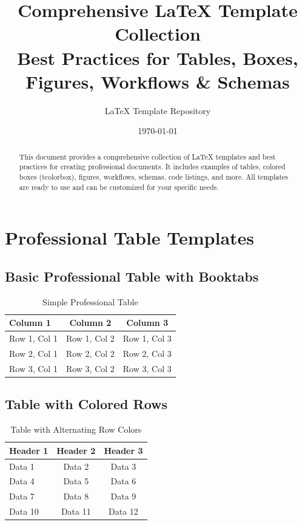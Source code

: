 \documentclass[a4paper,12pt]{article}
\title{\textbf{Comprehensive LaTeX Template Collection}\\
\large Best Practices for Tables, Boxes, Figures, Workflows \& Schemas}
\author{LaTeX Template Repository}
\date{\today}
\begin{document}
\maketitle

\begin{abstract}
This document provides a comprehensive collection of LaTeX templates and best 
practices for creating professional documents. It includes examples of tables, 
colored boxes (tcolorbox), figures, workflows, schemas, code listings, and more.
All templates are ready to use and can be customized for your specific needs.
\end{abstract}

\tableofcontents
\newpage

\section{Professional Table Templates}

\subsection{Basic Professional Table with Booktabs}
\begin{table}[H]
\centering
\caption{Simple Professional Table}
\label{tab:simple}
\begin{tabular}{lcc}
\toprule
\textbf{Column 1} & \textbf{Column 2} & \textbf{Column 3} \\
\midrule
Row 1, Col 1 & Row 1, Col 2 & Row 1, Col 3 \\
Row 2, Col 1 & Row 2, Col 2 & Row 2, Col 3 \\
Row 3, Col 1 & Row 3, Col 2 & Row 3, Col 3 \\
\bottomrule
\end{tabular}
\end{table}

\subsection{Table with Colored Rows}
\begin{table}[H]
\centering
\caption{Table with Alternating Row Colors}
\label{tab:colored}
\begin{tabular}{lcc}
\toprule
\rowcolor{primary!20}
\textbf{Header 1} & \textbf{Header 2} & \textbf{Header 3} \\
\midrule
\rowcolor{lightgray}
Data 1 & Data 2 & Data 3 \\
Data 4 & Data 5 & Data 6 \\
\rowcolor{lightgray}
Data 7 & Data 8 & Data 9 \\
Data 10 & Data 11 & Data 12 \\
\bottomrule
\end{tabular}
\end{table}
\end{document}
